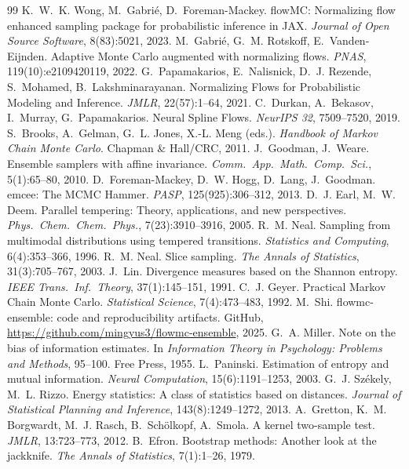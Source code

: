 \documentclass[11pt]{article}
\begin{document}
\begin{thebibliography}{99}
 K.~W.~K. Wong, M.~Gabri\'e, D.~Foreman-Mackey. flowMC:
Normalizing flow enhanced sampling package for probabilistic inference in JAX.
\textit{Journal of Open Source Software}, 8(83):5021, 2023.
 M.~Gabri\'e, G.~M. Rotskoff, E.~Vanden-Eijnden. Adaptive
Monte Carlo augmented with normalizing flows. \textit{PNAS},
119(10):e2109420119, 2022.
 G.~Papamakarios, E.~Nalisnick, D.~J. Rezende,
S.~Mohamed, B.~Lakshminarayanan. Normalizing Flows for Probabilistic Modeling
and Inference. \textit{JMLR}, 22(57):1--64, 2021.
 C.~Durkan, A.~Bekasov, I.~Murray, G.~Papamakarios. Neural
Spline Flows. \textit{NeurIPS 32}, 7509--7520, 2019.
 S.~Brooks, A.~Gelman, G.~L. Jones, X.-L. Meng (eds.).
\textit{Handbook of Markov Chain Monte Carlo}. Chapman \& Hall/CRC, 2011.
 J.~Goodman, J.~Weare. Ensemble samplers with affine
invariance. \textit{Comm.\ App.\ Math.\ Comp.\ Sci.}, 5(1):65--80, 2010.
 D.~Foreman-Mackey, D.~W. Hogg, D.~Lang, J.~Goodman. emcee:
The MCMC Hammer. \textit{PASP}, 125(925):306--312, 2013.
 D.~J. Earl, M.~W. Deem. Parallel tempering: Theory,
applications, and new perspectives. \textit{Phys.\ Chem.\ Chem.\ Phys.},
7(23):3910--3916, 2005.
 R.~M. Neal. Sampling from multimodal distributions using
tempered transitions. \textit{Statistics and Computing}, 6(4):353--366, 1996.
 R.~M. Neal. Slice sampling. \textit{The Annals of
Statistics}, 31(3):705--767, 2003.
 J.~Lin. Divergence measures based on the Shannon entropy.
\textit{IEEE Trans.\ Inf.\ Theory}, 37(1):145--151, 1991.
 C.~J. Geyer. Practical Markov Chain Monte Carlo.
\textit{Statistical Science}, 7(4):473--483, 1992.
 M.~Shi. flowmc-ensemble: code and reproducibility artifacts.
GitHub, \url{https://github.com/mingyus3/flowmc-ensemble}, 2025.
 G.~A. Miller. Note on the bias of information estimates.
In \textit{Information Theory in Psychology: Problems and Methods}, 95--100.
Free Press, 1955.
 L.~Paninski. Estimation of entropy and mutual
information. \textit{Neural Computation}, 15(6):1191--1253, 2003.
 G.~J. Sz\'ekely, M.~L. Rizzo. Energy statistics: A class
of statistics based on distances. \textit{Journal of Statistical Planning and
Inference}, 143(8):1249--1272, 2013.
 A.~Gretton, K.~M. Borgwardt, M.~J. Rasch,
B.~Sch\"olkopf, A.~Smola. A kernel two-sample test. \textit{JMLR},
13:723--773, 2012.
 B.~Efron. Bootstrap methods: Another look at the
jackknife. \textit{The Annals of Statistics}, 7(1):1--26, 1979.
\end{thebibliography}
\end{document}
